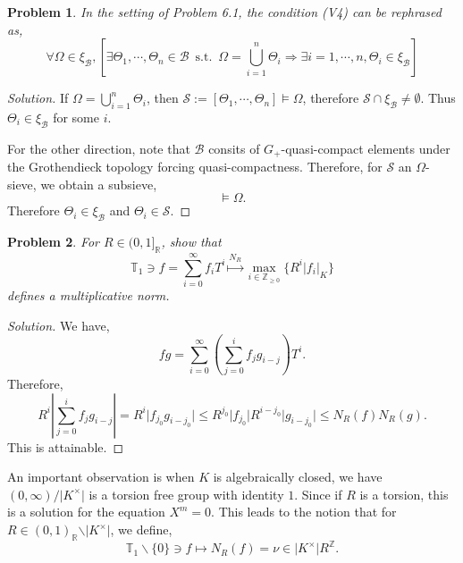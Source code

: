 \documentclass[8pt]{article}
\numberwithin{equation}{section}
\newenvironment{solution}{\begin{proof}[Solution]}{\end{proof}}
\newtheorem{problem}{Problem}[section]
\DeclareMathOperator{\straw}{s.t.}
\newcommand{\R}[0]{\mathbb{R}}
\newcommand{\Z}[0]{\mathbb{Z}}
\newcommand{\T}[0]{\mathbb{T}}
\newcommand{\ab}[1]{\vert #1 \vert}
\newcommand{\st}[0]{\:\straw\:}
\newcommand{\sS}[0]{\mathscr{S}}
\newcommand{\cB}[0]{\mathcal{B}}
\begin{document}
\begin{problem}
  In the setting of Problem 6.1, the condition (V4) can be rephrased as,
  \begin{equation*}
    \forall \Omega\in\xi_\cB, [\exists \Theta_1,\cdots,\Theta_n\in\cB\st \Omega = \bigcup_{i=1}^n\Theta_i\Rightarrow \exists i=1,\cdots,n,\Theta_i\in\xi_\cB]
  \end{equation*}
\end{problem}
\begin{solution}
  If $\Omega = \bigcup_{i=1}^n\Theta_i$, then $\mathcal{S}:=[\Theta_1,\cdots,\Theta_n]\vDash \Omega$, therefore $\mathcal{S}\cap\xi_{\mathcal{B}}\not=\emptyset$. Thus $\Theta_i\in\xi_\mathcal{B}$ for some $i$.
  \par For the other direction, note that $\cB$ consits of $G_+$-quasi-compact elements under the Grothendieck topology forcing quasi-compactness. Therefore, for $\sS$ an $\Omega$-sieve, we obtain a subsieve,
  \begin{equation*}
    [\Theta_1,\cdots,\Theta_n]\vDash \Omega.
  \end{equation*}
  Therefore $\Theta_i\in\xi_\cB$ and $\Theta_i\in\sS$.
\end{solution}
\begin{problem}
  For $R\in (0,1]_\R$, show that 
  \begin{equation*}
    \T_1\ni f=\sum_{i=0}^\infty f_iT^i \stackrel{N_R}{\mapsto}\max_{i\in\Z_{\geq0}}\{R^i\ab{f_i}_K\}
  \end{equation*}
  defines a multiplicative norm.
\end{problem}
\begin{solution}
  We have,
  \begin{equation*}
    fg = \sum_{i=0}^\infty \left(\sum_{j=0}^i f_jg_{i-j} \right)T^i.
  \end{equation*}
  Therefore,
  \begin{equation*}
    R^{i}\left\vert\sum_{j=0}^i f_jg_{i-j}\right\vert = R^i\ab{f_{j_0}g_{i-j_0}}\leq R^{j_0}\ab{f_{j_0}}R^{i-j_0}\ab{g_{i-j_0}}\leq N_R(f)N_R(g).
  \end{equation*}
  This is attainable.
\end{solution}
An important observation is when $K$ is algebraically closed, we have $(0,\infty)/\ab{K^\times}$ is a torsion free group with identity $1$. Since if $R$ is a torsion, this is a solution for the equation $X^m=0$. 
This leads to the notion that for $R\in(0,1)_\R\backslash\ab{K^\times}$, we define,
\begin{equation*}
  \T_1\backslash\{0\}\ni f\mapsto N_R(f) = \nu\in \ab{K^\times}R^\Z.
\end{equation*}
\end{document}
